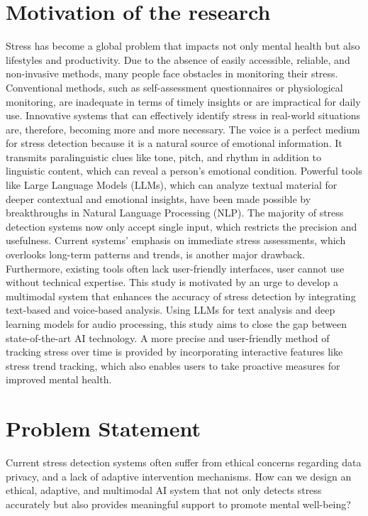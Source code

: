 \documentclass[Arial,12pt,openright,twoside]{book}
\begin{document}
  \section{Motivation of the research}
  Stress has become a global problem that impacts not only mental health but also lifestyles and productivity. Due to the absence of easily accessible, reliable, and non-invasive methods, many people face obstacles in monitoring their stress. Conventional methods, such as self-assessment questionnaires or physiological monitoring, are inadequate in terms of timely insights or are impractical for daily use. Innovative systems that can effectively identify stress in real-world situations are, therefore, becoming more and more necessary.
The voice is a perfect medium for stress detection because it is a natural source of emotional information. It transmits paralinguistic clues like tone, pitch, and rhythm in addition to linguistic content, which can reveal a person's emotional condition. Powerful tools like Large Language Models (LLMs), which can analyze textual material for deeper contextual and emotional insights, have been made possible by breakthroughs in Natural Language Processing (NLP). The majority of stress detection systems now only accept single input, which restricts the precision and usefulness. 
Current systems' emphasis on immediate stress assessments, which overlooks long-term patterns and trends, is another major drawback. Furthermore, existing tools often lack user-friendly interfaces, user cannot use without technical expertise.
This study is motivated by an urge to develop a multimodal system that enhances the accuracy of stress detection by integrating text-based and voice-based analysis. Using LLMs for text analysis and deep learning models for audio processing, this study aims to close the gap between state-of-the-art AI technology. A more precise and user-friendly method of tracking stress over time is provided by incorporating interactive features like stress trend tracking, which also enables users to take proactive measures for improved mental health.

  \section{Problem Statement}
  Current stress detection systems often suffer from ethical concerns regarding data privacy, and a lack of adaptive intervention mechanisms. How can we design an ethical, adaptive, and multimodal AI system that not only detects stress accurately but also provides meaningful support to promote mental well-being?
\end{document}
